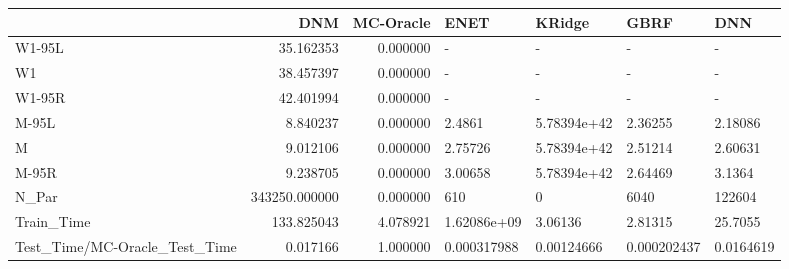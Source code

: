 \begin{tabular}{lrrllll}
\toprule
{} &            DNM &  MC-Oracle &         ENET &       KRidge &         GBRF &        DNN \\
\midrule
W1-95L                        &      35.162353 &   0.000000 &            - &            - &            - &          - \\
W1                            &      38.457397 &   0.000000 &            - &            - &            - &          - \\
W1-95R                        &      42.401994 &   0.000000 &            - &            - &            - &          - \\
M-95L                         &       8.840237 &   0.000000 &       2.4861 &  5.78394e+42 &      2.36255 &    2.18086 \\
M                             &       9.012106 &   0.000000 &      2.75726 &  5.78394e+42 &      2.51214 &    2.60631 \\
M-95R                         &       9.238705 &   0.000000 &      3.00658 &  5.78394e+42 &      2.64469 &     3.1364 \\
N\_Par                         &  343250.000000 &   0.000000 &          610 &            0 &         6040 &     122604 \\
Train\_Time                    &     133.825043 &   4.078921 &  1.62086e+09 &      3.06136 &      2.81315 &    25.7055 \\
Test\_Time/MC-Oracle\_Test\_Time &       0.017166 &   1.000000 &  0.000317988 &   0.00124666 &  0.000202437 &  0.0164619 \\
\bottomrule
\end{tabular}
